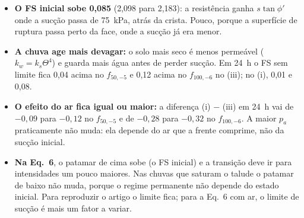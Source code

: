\documentclass[11pt,a4paper]{article}
\begin{document}
\begin{itemize}
  \item \textbf{O FS inicial sobe 0,085} (2,098 para 2,183): a resistência ganha $s\tan\phi'$ onde a sucção passa de
    75~kPa, atrás da crista. Pouco, porque a superfície de ruptura passa perto da face, onde a sucção já era menor.
  \item \textbf{A chuva age mais devagar:} o solo mais seco é menos permeável ($k_w = k_s\Theta^4$) e guarda mais
    água antes de perder sucção. Em 24~h o FS sem limite fica 0,04 acima no $f_{50,-5}$ e 0,12 acima no $f_{100,-6}$
    no (iii); no (i), 0,01 e 0,08.
  \item \textbf{O efeito do ar fica igual ou maior:} a diferença (i) $-$ (iii) em 24~h vai de $-0{,}09$ para $-0{,}12$
    no $f_{50,-5}$ e de $-0{,}28$ para $-0{,}32$ no $f_{100,-6}$. A maior $p_a$ praticamente não muda: ela depende do ar
    que a frente comprime, não da sucção inicial.
  \item \textbf{Na Eq.~6}, o patamar de cima sobe (o FS inicial) e a transição deve ir para intensidades um pouco
    maiores. Nas chuvas que saturam o talude o patamar de baixo não muda, porque o regime permanente não depende do
    estado inicial. Para reproduzir o artigo o limite fica; para a Eq.~6 com ar, o limite de sucção é mais um fator a
    variar.
\end{itemize}
\end{document}
